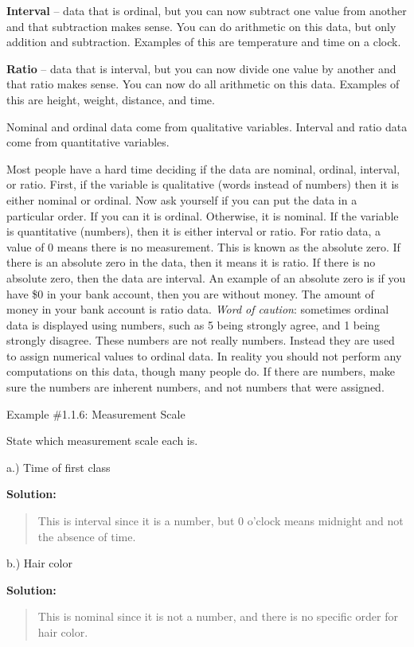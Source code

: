 \documentclass[]{book}
\begin{document}
\textbf{Interval} -- data that is ordinal, but you can now subtract one value from another and that subtraction makes sense. You can do arithmetic on this data, but only addition and subtraction. Examples of this are temperature and time on a clock.

\textbf{Ratio} -- data that is interval, but you can now divide one value by another and that ratio makes sense. You can now do all arithmetic on this data. Examples of this are height, weight, distance, and time.

Nominal and ordinal data come from qualitative variables. Interval and ratio data come from quantitative variables.

Most people have a hard time deciding if the data are nominal, ordinal, interval, or ratio. First, if the variable is qualitative (words instead of numbers) then it is either nominal or ordinal. Now ask yourself if you can put the data in a particular order. If you can it is ordinal. Otherwise, it is nominal. If the variable is quantitative (numbers), then it is either interval or ratio. For ratio data, a value of 0 means there is no measurement. This is known as the absolute zero. If there is an absolute zero in the data, then it means it is ratio. If there is no absolute zero, then the data are interval. An example of an absolute zero is if you have \$0 in your bank account, then you are without money. The amount of money in your bank account is ratio data. \emph{Word of caution}: sometimes ordinal data is displayed using numbers, such as 5 being strongly agree, and 1 being strongly disagree. These numbers are not really numbers. Instead they are used to assign numerical values to ordinal data. In reality you should not perform any computations on this data, though many people do. If there are numbers, make sure the numbers are inherent numbers, and not numbers that were assigned.

Example \#1.1.6: Measurement Scale

State which measurement scale each is.

a.) Time of first class

\textbf{Solution:}

\begin{quote}
This is interval since it is a number, but 0 o'clock means midnight and not the absence of time.
\end{quote}

b.) Hair color

\textbf{Solution:}

\begin{quote}
This is nominal since it is not a number, and there is no specific order for hair color.
\end{quote}
\end{document}
